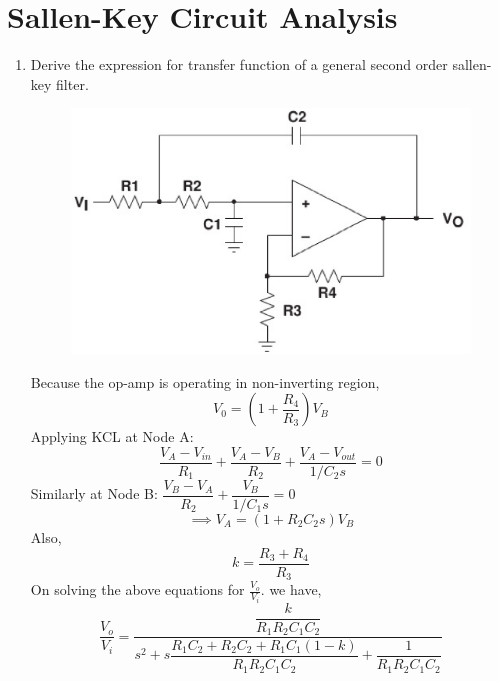 \documentclass[journal,12pt,twocolumn]{IEEEtran}
\renewcommand\thesection{\arabic{section}}
\begin{document}
\section{Sallen-Key Circuit Analysis}
\begin{enumerate}[label=\thesection.\arabic*,ref=\thesection.\theenumi]
\item Derive the expression for transfer function of a general second order sallen-key filter.\\
\solution
\begin{figure}[!ht]
\centering
\includegraphics[width=0.7\columnwidth]{./figs/sallen_key_general.eps}
\caption{}
\label{fig:2}
\end{figure}
Because the op-amp is operating in non-inverting region,
\begin{equation}
V_{0} = (1+\dfrac{R_{4}}{R_{3}})V_{B}
\end{equation}
Applying KCL at Node A:
\begin{equation}
\dfrac{V_{A}-V_{in}}{R_{1}} + \dfrac{V_{A}-V_{B}}{R_{2}} + \dfrac{V_{A}-V_{out}}{1/C_{2}s} = 0
\end{equation}
Similarly at Node B:
$\dfrac{V_{B}-V_{A}}{R_{2}} + \dfrac{V_{B}}{1/C_{1}s}=0$
\begin{equation}
\implies V_{A}=(1+R_{2}C_{2}s)V_{B}
\end{equation}
Also,
\begin{equation}
k = \dfrac{R_{3}+R_{4}}{R_{3}}
\end{equation}
On solving the above equations for $\frac{V_o}{V_i}$. we have, 
\begin{equation}
\frac{V_o}{V_i} = \dfrac{\dfrac{k}{R_{1}R_{2}C_{1}C_{2}}}{s^{2} + s\dfrac{R_{1}C_{2}+R_{2}C_{2}+R_{1}C_{1}(1-k)}{R_{1}R_{2}C_{1}C_{2}} + \dfrac{1}{R_{1}R_{2}C_{1}C_{2}}}
\end{equation}


\end{enumerate}
\end{document}
